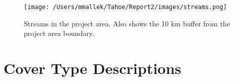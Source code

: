 \begin{figure}[htbp]
\centering
\texttt{[image: /Users/mmallek/Tahoe/Report2/images/streams.png]}
\caption{Streams in the project area. Also shows the 10 km buffer from the project area boundary.} 
\label{streamsmap}
\end{figure}

\chapter{Cover Type Descriptions}
\label{app:covertypedesc}

%
%
%
%
%
%
%
%
%
%
%
%
%

